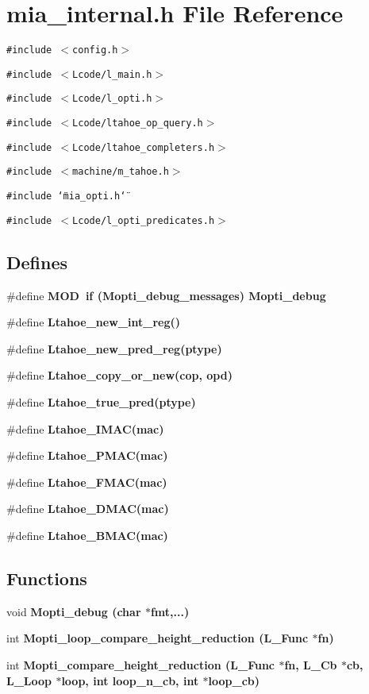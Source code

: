 \section{mia\_\-internal.h File Reference}
\label{mia__internal_8h}
{\tt \#include $<$config.h$>$}\par
{\tt \#include $<$Lcode/l\_\-main.h$>$}\par
{\tt \#include $<$Lcode/l\_\-opti.h$>$}\par
{\tt \#include $<$Lcode/ltahoe\_\-op\_\-query.h$>$}\par
{\tt \#include $<$Lcode/ltahoe\_\-completers.h$>$}\par
{\tt \#include $<$machine/m\_\-tahoe.h$>$}\par
{\tt \#include \char`\"{}mia\_\-opti.h\char`\"{}}\par
{\tt \#include $<$Lcode/l\_\-opti\_\-predicates.h$>$}\par
\subsection*{Defines}
\begin{CompactItemize}
\item 
\#define \bf{MOD}~if (\bf{Mopti\_\-debug\_\-messages}) Mopti\_\-debug
\item 
\#define \bf{Ltahoe\_\-new\_\-int\_\-reg}()
\item 
\#define \bf{Ltahoe\_\-new\_\-pred\_\-reg}(ptype)
\item 
\#define \bf{Ltahoe\_\-copy\_\-or\_\-new}(cop, opd)
\item 
\#define \bf{Ltahoe\_\-true\_\-pred}(ptype)
\item 
\#define \bf{Ltahoe\_\-IMAC}(mac)
\item 
\#define \bf{Ltahoe\_\-PMAC}(mac)
\item 
\#define \bf{Ltahoe\_\-FMAC}(mac)
\item 
\#define \bf{Ltahoe\_\-DMAC}(mac)
\item 
\#define \bf{Ltahoe\_\-BMAC}(mac)
\end{CompactItemize}
\subsection*{Functions}
\begin{CompactItemize}
\item 
void \bf{Mopti\_\-debug} (char $\ast$fmt,...)
\item 
int \bf{Mopti\_\-loop\_\-compare\_\-height\_\-reduction} (L\_\-Func $\ast$fn)
\item 
int \bf{Mopti\_\-compare\_\-height\_\-reduction} (L\_\-Func $\ast$fn, L\_\-Cb $\ast$cb, L\_\-Loop $\ast$loop, int loop\_\-n\_\-cb, int $\ast$\bf{loop\_\-cb})
\end{CompactItemize}


